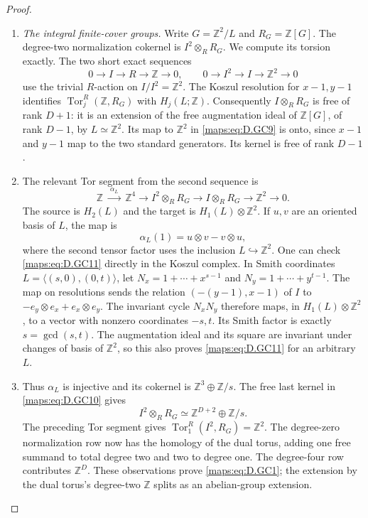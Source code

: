 \begin{proof}
\begin{enumerate}[label=\arabic*.,leftmargin=*]
\item \emph{The integral finite-cover groups.}
Write $G=\mathbb Z^2/L$ and $R_G=\mathbb Z[G]$.
The degree-two normalization cokernel is
$I^2\otimes_R R_G$. We compute its torsion exactly.
The two short exact sequences
\[
 0\to I\to R\to\mathbb Z\to0,\qquad
 0\to I^2\to I\to\mathbb Z^2\to0
                                                        \tag{D.GC9}\label{maps:eq:D.GC9}
\]
use the trivial $R$-action on $I/I^2=\mathbb Z^2$.
The Koszul resolution for $x-1,y-1$ identifies
$\operatorname{Tor}^R_j(\mathbb Z,R_G)$ with
$H_j(L;\mathbb Z)$.
Consequently $I\otimes_R R_G$ is free of rank $D+1$:
it is an extension of the free augmentation ideal
of $\mathbb Z[G]$, of rank $D-1$, by $L\simeq\mathbb Z^2$.
Its map to $\mathbb Z^2$ in \eqref{maps:eq:D.GC9} is onto,
since $x-1$ and $y-1$ map to the two standard
generators. Its kernel is free of rank $D-1$.

\item The relevant Tor segment from the second sequence is
\[
 \mathbb Z\ \xrightarrow{\;\alpha_L\;}\ \mathbb Z^4
 \longrightarrow I^2\otimes_RR_G
 \longrightarrow I\otimes_RR_G
 \longrightarrow\mathbb Z^2\longrightarrow0 .
                                                        \tag{D.GC10}\label{maps:eq:D.GC10}
\]
The source is $H_2(L)$ and the target is
$H_1(L)\otimes\mathbb Z^2$.
If $u,v$ are an oriented basis of $L$, the map is
\[
                  \alpha_L(1)=u\otimes v-v\otimes u,
                                                        \tag{D.GC11}\label{maps:eq:D.GC11}
\]
where the second tensor factor uses the inclusion
$L\hookrightarrow\mathbb Z^2$.
One can check \eqref{maps:eq:D.GC11} directly in the Koszul
complex. In Smith coordinates
$L=\langle(s,0),(0,t)\rangle$, let
$N_x=1+\cdots+x^{s-1}$ and
$N_y=1+\cdots+y^{t-1}$.
The map on resolutions sends the relation
$(-(y-1),x-1)$ of $I$ to
$-e_y\otimes e_x+e_x\otimes e_y$.
The invariant cycle $N_xN_y$ therefore maps,
in $H_1(L)\otimes\mathbb Z^2$, to a vector with
nonzero coordinates $-s,t$.
Its Smith factor is exactly $s=\gcd(s,t)$.
The augmentation ideal and its square are invariant
under changes of basis of $\mathbb Z^2$, so this
also proves \eqref{maps:eq:D.GC11} for an arbitrary $L$.

\item Thus $\alpha_L$ is injective and its cokernel is
$\mathbb Z^3\oplus\mathbb Z/s$.
The free last kernel in \eqref{maps:eq:D.GC10} gives
\[
            I^2\otimes_RR_G
                    \simeq\mathbb Z^{D+2}\oplus\mathbb Z/s.
                                                        \tag{D.GC12}\label{maps:eq:D.GC12}
\]
The preceding Tor segment gives
$\operatorname{Tor}_1^R(I^2,R_G)=\mathbb Z^2$.
The degree-zero normalization row now has the
homology of the dual torus, adding one free
summand to total degree two and two to degree
one. The degree-four row contributes $\mathbb Z^D$.
These observations prove \eqref{maps:eq:D.GC1}; the extension
by the dual torus's degree-two $\mathbb Z$ splits
as an abelian-group extension.


\end{enumerate}
\end{proof}
